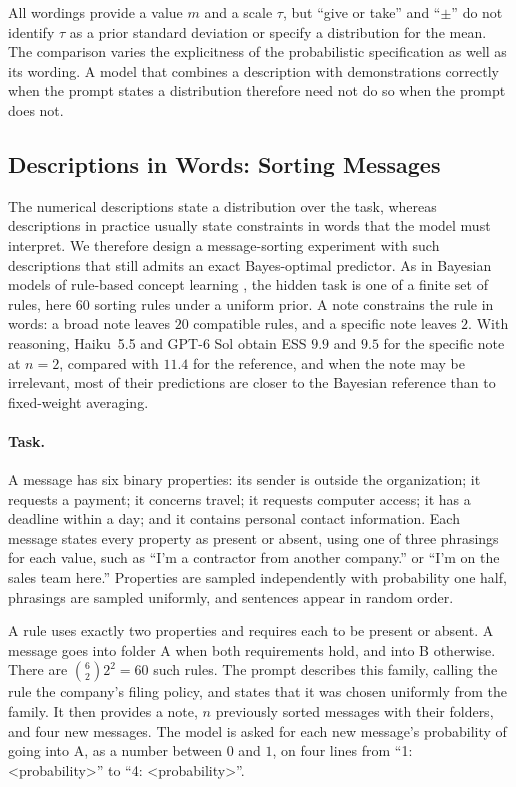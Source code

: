 \documentclass{article}
\theoremstyle{definition}
\begin{document}
All wordings provide a value $m$ and a scale $\tau$, but ``give or take'' and ``$\pm$'' do not identify $\tau$ as a prior standard deviation or specify a distribution for the mean. The comparison varies the explicitness of the probabilistic specification as well as its wording. A model that combines a description with demonstrations correctly when the prompt states a distribution therefore need not do so when the prompt does not.

\subsection{Descriptions in Words: Sorting Messages}\label{app:semantic}

The numerical descriptions state a distribution over the task, whereas descriptions in practice usually state constraints in words that the model must interpret. We therefore design a message-sorting experiment with such descriptions that still admits an exact Bayes-optimal predictor. As in Bayesian models of rule-based concept learning \citep{goodman2008}, the hidden task is one of a finite set of rules, here $60$ sorting rules under a uniform prior. A note constrains the rule in words: a broad note leaves $20$ compatible rules, and a specific note leaves $2$. With reasoning, Haiku~5.5 and GPT-6 Sol obtain ESS $9.9$ and $9.5$ for the specific note at $n=2$, compared with $11.4$ for the reference, and when the note may be irrelevant, most of their predictions are closer to the Bayesian reference than to fixed-weight averaging.

\paragraph{Task.}
A message has six binary properties: its sender is outside the organization; it requests a payment; it concerns travel; it requests computer access; it has a deadline within a day; and it contains personal contact information. Each message states every property as present or absent, using one of three phrasings for each value, such as ``I'm a contractor from another company.'' or ``I'm on the sales team here.'' Properties are sampled independently with probability one half, phrasings are sampled uniformly, and sentences appear in random order.

A rule uses exactly two properties and requires each to be present or absent. A message goes into folder A when both requirements hold, and into B otherwise. There are $\binom{6}{2}2^2=60$ such rules. The prompt describes this family, calling the rule the company's filing policy, and states that it was chosen uniformly from the family. It then provides a note, $n$ previously sorted messages with their folders, and four new messages. The model is asked for each new message's probability of going into A, as a number between $0$ and $1$, on four lines from ``1: \textless probability\textgreater'' to ``4: \textless probability\textgreater''.
\end{document}
